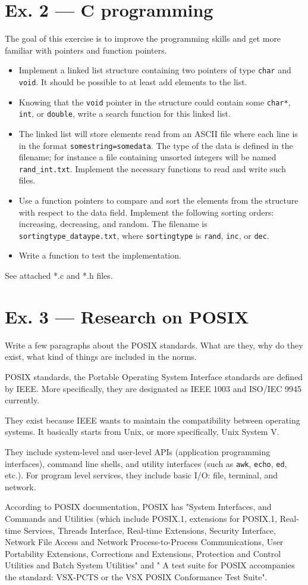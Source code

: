 \documentclass[a4paper]{article}
\begin{document}
\section*{Ex. 2 — C programming}
The goal of this exercise is to improve the programming skills and get more familiar with pointers and function pointers.
\begin{itemize}
    \item Implement a linked list structure containing two pointers of type \texttt{char} and \texttt{void}. It should be possible to at least add elements to the list.
    \item Knowing that the \texttt{void} pointer in the structure could contain some \texttt{char*}, \texttt{int}, or \texttt{double}, write a search function for this linked list.
    \item The linked list will store elements read from an ASCII file where each line is in the format \texttt{somestring=somedata}. The type of the data is defined in the filename; for instance a file containing unsorted integers will be named \texttt{rand\_int.txt}. Implement the necessary functions to read and write such files.
    \item Use a function pointers to compare and sort the elements from the structure with respect to the data field. Implement the following sorting orders: increasing, decreasing, and random. The filename is \texttt{sortingtype\_dataype.txt}, where \texttt{sortingtype} is \texttt{rand}, \texttt{inc}, or \texttt{dec}.
    \item Write a function to test the implementation.
\end{itemize}
See attached *.c and *.h files.
\section*{Ex. 3 — Research on POSIX}
Write a few paragraphs about the POSIX standards. What are they, why do they exist, what kind of things are included in the norms.

POSIX standards, the Portable Operating System Interface standards are defined by IEEE. More specifically, they are designated as IEEE 1003 and ISO/IEC 9945 currently.

They exist because IEEE wants to maintain the compatibility between operating systems. It basically starts from Unix, or more specifically, Unix System V.

They include system-level and user-level APIs (application programming interfaces), command line shells, and utility interfaces (such as \texttt{awk}, \texttt{echo}, \texttt{ed}, etc.). For program level services, they include basic I/O: file, terminal, and network.

According to POSIX documentation, POSIX has "System Interfaces, and Commands and Utilities (which include POSIX.1, extensions for POSIX.1, Real-time Services, Threads Interface, Real-time Extensions, Security Interface, Network File Access and Network Process-to-Process Communications, User Portability Extensions, Corrections and Extensions, Protection and Control Utilities and Batch System Utilities" and " A test suite for POSIX accompanies the standard: VSX-PCTS or the VSX POSIX Conformance Test Suite".
\end{document}
